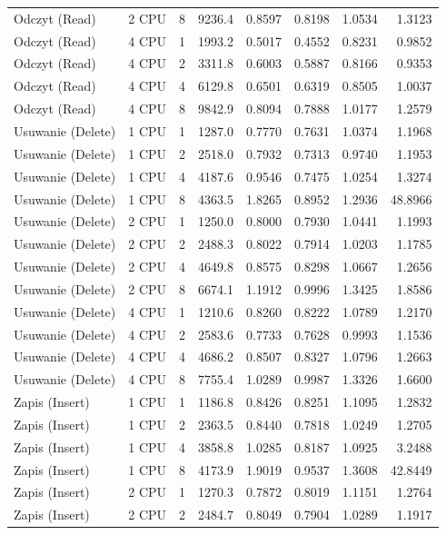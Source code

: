 \begin{table}[ht]
{\begin{tabular}{llcrrrrr}
Odczyt (Read) & 2 CPU & 8 & 9236.4 & 0.8597 & 0.8198 & 1.0534 & 1.3123 \\
Odczyt (Read) & 4 CPU & 1 & 1993.2 & 0.5017 & 0.4552 & 0.8231 & 0.9852 \\
Odczyt (Read) & 4 CPU & 2 & 3311.8 & 0.6003 & 0.5887 & 0.8166 & 0.9353 \\
Odczyt (Read) & 4 CPU & 4 & 6129.8 & 0.6501 & 0.6319 & 0.8505 & 1.0037 \\
Odczyt (Read) & 4 CPU & 8 & 9842.9 & 0.8094 & 0.7888 & 1.0177 & 1.2579 \\
Usuwanie (Delete) & 1 CPU & 1 & 1287.0 & 0.7770 & 0.7631 & 1.0374 & 1.1968 \\
Usuwanie (Delete) & 1 CPU & 2 & 2518.0 & 0.7932 & 0.7313 & 0.9740 & 1.1953 \\
Usuwanie (Delete) & 1 CPU & 4 & 4187.6 & 0.9546 & 0.7475 & 1.0254 & 1.3274 \\
Usuwanie (Delete) & 1 CPU & 8 & 4363.5 & 1.8265 & 0.8952 & 1.2936 & 48.8966 \\
Usuwanie (Delete) & 2 CPU & 1 & 1250.0 & 0.8000 & 0.7930 & 1.0441 & 1.1993 \\
Usuwanie (Delete) & 2 CPU & 2 & 2488.3 & 0.8022 & 0.7914 & 1.0203 & 1.1785 \\
Usuwanie (Delete) & 2 CPU & 4 & 4649.8 & 0.8575 & 0.8298 & 1.0667 & 1.2656 \\
Usuwanie (Delete) & 2 CPU & 8 & 6674.1 & 1.1912 & 0.9996 & 1.3425 & 1.8586 \\
Usuwanie (Delete) & 4 CPU & 1 & 1210.6 & 0.8260 & 0.8222 & 1.0789 & 1.2170 \\
Usuwanie (Delete) & 4 CPU & 2 & 2583.6 & 0.7733 & 0.7628 & 0.9993 & 1.1536 \\
Usuwanie (Delete) & 4 CPU & 4 & 4686.2 & 0.8507 & 0.8327 & 1.0796 & 1.2663 \\
Usuwanie (Delete) & 4 CPU & 8 & 7755.4 & 1.0289 & 0.9987 & 1.3326 & 1.6600 \\
Zapis (Insert) & 1 CPU & 1 & 1186.8 & 0.8426 & 0.8251 & 1.1095 & 1.2832 \\
Zapis (Insert) & 1 CPU & 2 & 2363.5 & 0.8440 & 0.7818 & 1.0249 & 1.2705 \\
Zapis (Insert) & 1 CPU & 4 & 3858.8 & 1.0285 & 0.8187 & 1.0925 & 3.2488 \\
Zapis (Insert) & 1 CPU & 8 & 4173.9 & 1.9019 & 0.9537 & 1.3608 & 42.8449 \\
Zapis (Insert) & 2 CPU & 1 & 1270.3 & 0.7872 & 0.8019 & 1.1151 & 1.2764 \\
Zapis (Insert) & 2 CPU & 2 & 2484.7 & 0.8049 & 0.7904 & 1.0289 & 1.1917 \\

\end{tabular}}
\end{table}
